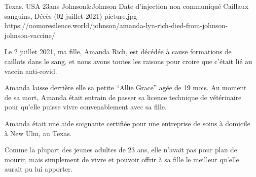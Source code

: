           {Texas, USA}
          {23ans}
          {Johnson\&Johnson}
          {Date d'injection non communiqué}
          {Caillaux sanguins,
          Décès (02 juillet 2021)}
          {picture.jpg}
          {https://nomoresilence.world/johnson/amanda-lyn-rich-died-from-johnson-johnson-vaccine/}
          {

Le 2 juillet 2021, ma fille, Amanda Rich, est décédée à cause formations de
caillots dans le sang, et nous avons toutes les raisons pour croire que c'était
lié au vaccin anti-covid.

Amanda laisse derrière elle sa petite “Allie Grace” agée de 19 mois. Au moment
de sa mort, Amanda était entrain de passer sa licence technique de vétérinaire
pour qu'elle puisse vivre convenablement avec sa fille.

Amanda était une aide soignante certifiée pour une entreprise de soins à
domicile à New Ulm, au Texas.

Comme la plupart des jeunes adultes de 23 ans, elle n'avait pas pour plan de
mourir, mais simplement de vivre et pouvoir offrir à sa fille le meilleur
qu'elle aurait pu lui apporter.

}
